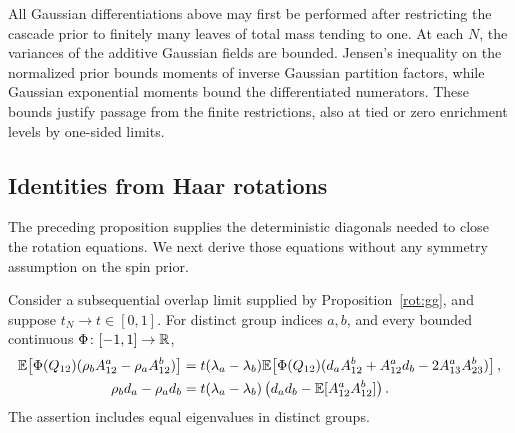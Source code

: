 All Gaussian differentiations above may first be performed after
restricting the cascade prior to finitely many leaves of total mass
tending to one.  At each \(N\), the variances of the additive
Gaussian fields are bounded.  Jensen's inequality on the normalized
prior bounds moments of inverse Gaussian partition factors, while
Gaussian exponential moments bound the differentiated numerators.
These bounds justify passage from the finite restrictions, also
at tied or zero enrichment levels by one-sided limits.

\subsection{Identities from Haar rotations}

The preceding proposition supplies the deterministic diagonals needed
to close the rotation equations.  We next derive those equations
without any symmetry assumption on the spin prior.

\begin{proposition}\label{rot:ward}
Consider a subsequential overlap limit supplied by
Proposition~\ref{rot:gg}, and suppose \(t_N\to t\in[0,1]\).
For distinct group indices \(a,b\), and every bounded continuous
\(\Phi\colon[-1,1]\to\mathbb R\),
\begin{align}
 \mathbb E\!\left[\Phi(Q_{12})
        (\rho_b A^a_{12}-\rho_a A^b_{12})\right]
 ={}&t(\lambda_a-\lambda_b)
 \mathbb E\!\left[\Phi(Q_{12})
        (d_a A^b_{12}+A^a_{12}d_b-2A^a_{13}A^b_{23})\right],
 \label{rot:ward-off}\\
 \rho_b d_a-\rho_a d_b
 ={}&t(\lambda_a-\lambda_b)
       \left(d_a d_b-\mathbb E[A^a_{12}A^b_{12}]\right).
 \label{rot:ward-diag}
\end{align}
The assertion includes equal eigenvalues in distinct groups.
\end{proposition}

